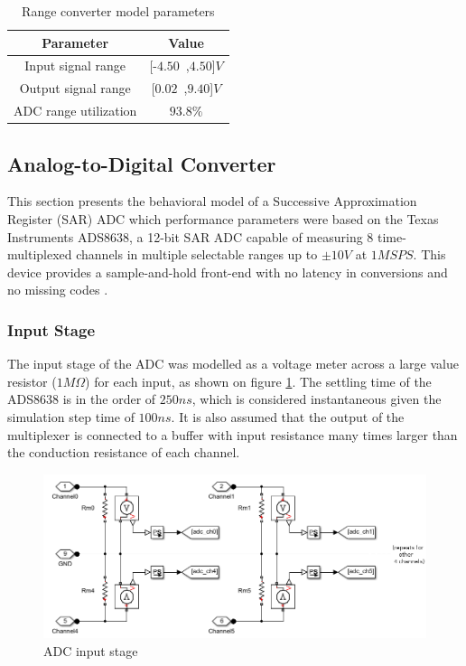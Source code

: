 \documentclass[conference]{IEEEtran}
\begin{document}
\begin{table}[h!]
\centering
\caption{Range converter model parameters}
\label{tab:rangeconvfinal2}
\begin{tabular}{|c|c|}
\hline
Parameter & Value \\ \hline
Input signal range  & [-$4.50$~,$4.50$]$V$  \\ \hline
Output signal range  & [$0.02$~,$9.40$]$V$ \\ \hline
ADC range utilization & $93.8\%$ \\ \hline
\end{tabular}
\end{table}

\subsection{Analog-to-Digital Converter}

This section presents the behavioral model of a Successive Approximation Register (SAR) ADC which performance parameters were based on the Texas Instruments ADS8638, a 12-bit SAR ADC capable of measuring 8 time-multiplexed channels in multiple selectable ranges up to $\pm 10V$ at $1 MSPS$. This device provides a sample-and-hold front-end with no latency in conversions and no missing codes \cite{ads8638}. 

\subsubsection{Input Stage}

The input stage of the ADC was modelled as a voltage meter across a large value resistor ($1M\Omega$) for each input, as shown on figure \ref{fig:adcinputstage}. The settling time of the ADS8638 is in the order of $250ns$, which is considered instantaneous given the simulation step time of $100ns$. It is also assumed that the output of the multiplexer is connected to a buffer with input resistance many times larger than the conduction resistance of each channel.


\begin{figure}[h!]
\centering
\includegraphics[scale=0.25]{pics/models/adc_input_block.png}
\caption{ADC input stage}
\label{fig:adcinputstage}
\end{figure}
\end{document}
